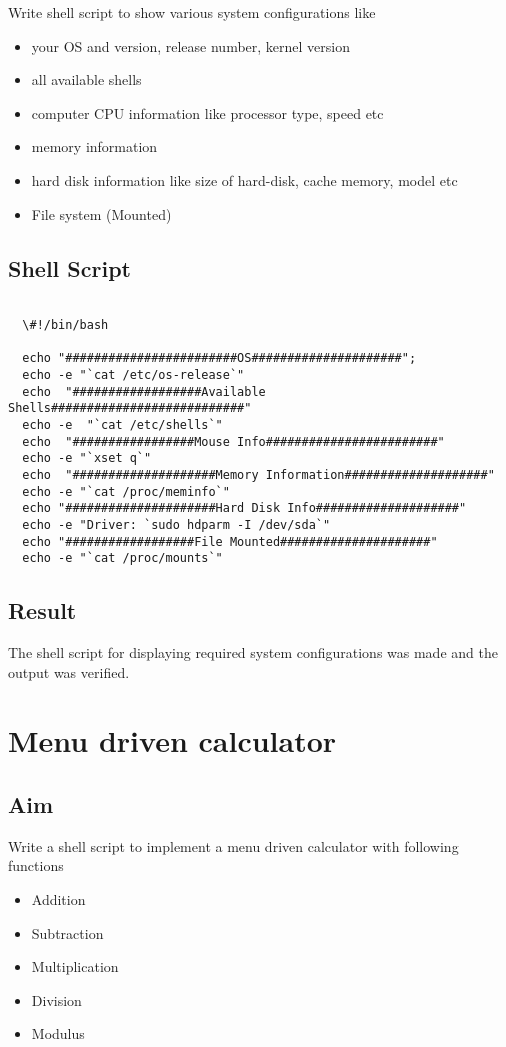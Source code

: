 \documentclass{article}
\begin{document}
Write shell script to show various system configurations like
\begin{itemize}
\item your OS and version, release number, kernel version
\item all available shells
\item computer CPU information like processor type, speed etc
\item memory information
\item hard disk information like size of hard-disk, cache memory, model etc
\item File system (Mounted)
\end{itemize}

\subsection{Shell Script}

\begin{verbatim}

  \#!/bin/bash
   
  echo "########################OS#####################";
  echo -e "`cat /etc/os-release`"
  echo  "##################Available Shells###########################"
  echo -e  "`cat /etc/shells`"
  echo  "#################Mouse Info########################"
  echo -e "`xset q`"
  echo  "####################Memory Information####################"
  echo -e "`cat /proc/meminfo`"
  echo "#####################Hard Disk Info####################"
  echo -e "Driver: `sudo hdparm -I /dev/sda`"
  echo "##################File Mounted#####################"
  echo -e "`cat /proc/mounts`"

\end{verbatim}

\subsection{Result}
The shell script for displaying required system configurations was made and the output was verified.

\newpage

\section{Menu driven calculator}
\subsection{Aim}
Write a shell script to implement a menu driven calculator with following functions
\begin{itemize}

\item Addition
\item Subtraction
\item Multiplication
\item Division
\item Modulus

\end{itemize}
\end{document}
